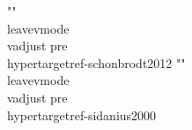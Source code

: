 {{{{{{{{{{{{{{{{{{{{{{{{{{{{""\\leavevmode\\vadjust pre{\\hypertarget{ref-schonbrodt2012}{}}%
""\\leavevmode\\vadjust pre{\\hypertarget{ref-sidanius2000}{}}%
}}}}}}}}}}}}}}}}}}}}}}}}}}}}
